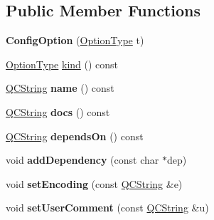 \subsection*{Public Member Functions}
\begin{DoxyCompactItemize}
\item 
\mbox{\label{class_config_option_a3ce6753bba05ab1ee7e5eaaec6d8f1ac}} 
{\bfseries Config\+Option} (\mbox{\hyperlink{class_config_option_ad60cb308cdf307e72796dc2fc2a40fda}{Option\+Type}} t)
\item 
\mbox{\hyperlink{class_config_option_ad60cb308cdf307e72796dc2fc2a40fda}{Option\+Type}} \mbox{\hyperlink{class_config_option_af9d4d56d36500792b82fce5b11202a60}{kind}} () const
\item 
\mbox{\label{class_config_option_ab89196927c521e95680eb5efdc562187}} 
\mbox{\hyperlink{class_q_c_string}{Q\+C\+String}} {\bfseries name} () const
\item 
\mbox{\label{class_config_option_a3c4dc05a2249a17ad0df0e943da4decd}} 
\mbox{\hyperlink{class_q_c_string}{Q\+C\+String}} {\bfseries docs} () const
\item 
\mbox{\label{class_config_option_a8a744f63445f4cd0ce86d7f423bc7161}} 
\mbox{\hyperlink{class_q_c_string}{Q\+C\+String}} {\bfseries depends\+On} () const
\item 
\mbox{\label{class_config_option_a290d4454155543728847a75ade256a32}} 
void {\bfseries add\+Dependency} (const char $\ast$dep)
\item 
\mbox{\label{class_config_option_a0ac357ec83d2014603c8d70a00c27a33}} 
void {\bfseries set\+Encoding} (const \mbox{\hyperlink{class_q_c_string}{Q\+C\+String}} \&e)
\item 
\mbox{\label{class_config_option_a5baa3fb6c4fb6ec667eb91172f3f398a}} 
void {\bfseries set\+User\+Comment} (const \mbox{\hyperlink{class_q_c_string}{Q\+C\+String}} \&u)
\end{DoxyCompactItemize}

